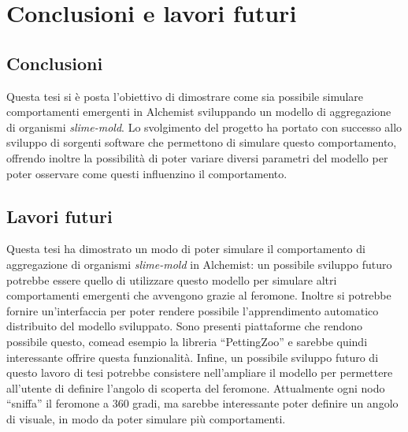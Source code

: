 \chapter{Conclusioni e lavori futuri}
\section{Conclusioni}
Questa tesi si è posta l'obiettivo di dimostrare come sia possibile simulare comportamenti emergenti in Alchemist sviluppando un modello
di aggregazione di organismi \textit{slime-mold}. 
Lo svolgimento del progetto ha portato con successo allo sviluppo di sorgenti software che permettono di simulare
questo comportamento, offrendo inoltre la possibilità di poter variare diversi parametri del modello per poter osservare
come questi influenzino il comportamento. 


\section{Lavori futuri}
Questa tesi ha dimostrato un modo di poter simulare il comportamento di aggregazione di organismi \textit{slime-mold} in Alchemist:
un possibile sviluppo futuro potrebbe essere quello di utilizzare questo modello per simulare altri comportamenti emergenti che avvengono 
grazie al feromone.\newline
Inoltre si potrebbe fornire un'interfaccia per poter 
rendere possibile l'apprendimento automatico distribuito del modello sviluppato.
Sono presenti piattaforme che rendono possibile questo, comead esempio la libreria ``PettingZoo''\cite{terry2021pettingzoo} e sarebbe quindi interessante offrire questa funzionalità.
Infine, un possibile sviluppo futuro di questo lavoro di tesi potrebbe consistere nell'ampliare il modello per permettere all'utente di definire l'angolo di 
scoperta del feromone. Attualmente ogni nodo ``sniffa'' il feromone a 360 gradi, ma sarebbe interessante
poter definire un angolo di visuale, in modo da poter simulare più comportamenti.